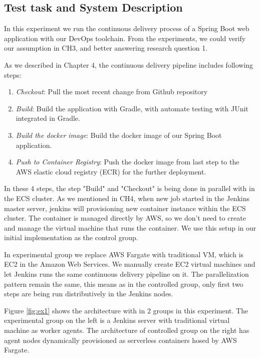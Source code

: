 \subsection{Test task and System Description}
In this experiment we run the continuous delivery process of a Spring Boot web application with our DevOps toolchain. From the experiments, we could verify our assumption in CH3, and better answering research question 1.
\par
As we described in Chapter 4, the continuous delivery pipeline includes following steps:
\begin{enumerate}
    \item \textit{Checkout}: Pull the most recent change from Github repository
    \item \textit{Build}: Build the application with Gradle, with automate testing with JUnit integrated in Gradle.
    \item \textit{Build the docker image}: Build the docker image of our Spring Boot application.
    \item \textit{Push to Container Registry}: Push the docker image from last step to the AWS elastic cloud registry (ECR) for the further deployment.
\end{enumerate}
\par
In these 4 steps, the step "Build" and "Checkout" is being done in parallel with in the ECS cluster. As we mentioned in CH4, when new job started in the Jenkins master server, jenkins will provisioning new container instance within the ECS cluster. The container is managed directly by AWS, so we don't need to create and manage the virtual machine that runs the container. We use this setup in our initial implementation as the control group.
\par
In experimental group we replace AWS Fargate with traditional VM, which is EC2 in the Amazon Web Services. We manually create EC2 virtual machines and let Jenkins runs the same continuous delivery pipeline on it. The parallelization pattern remain the same, this means as in the controlled group, only first two steps are being run distributively in the Jenkins nodes.
\par
Figure \ref{fig:ex1} shows the architecture with in 2 groups in this experiment. The experimental group on the left is a Jenkins server with traditional virtual machine as worker agents. The architecture of controlled group on the right has agent nodes dynamically provisioned as serverless containers hosed by AWS Fargate.
